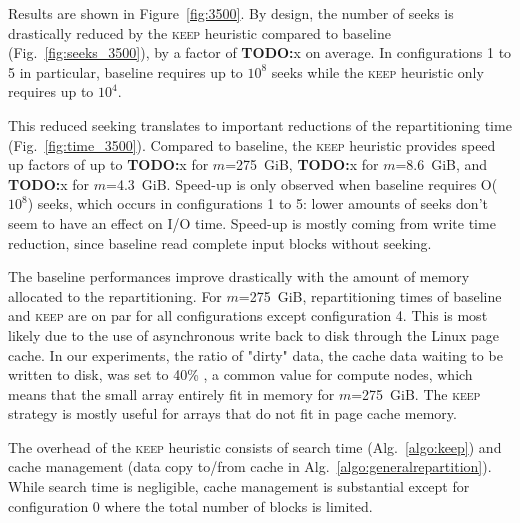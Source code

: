 \documentclass[sigconf, nonacm]{acmart}
\newcommand{\todo}[1]{\color{red}\textbf{TODO:}#1\color{black}}
\newcommand{\keep}[0]{\textsc{keep}\xspace}
\begin{document}
Results are shown in Figure~\ref{fig:3500}.
By design, the number of seeks is drastically reduced by the \keep
heuristic compared to baseline (Fig.~\ref{fig:seeks_3500}), by a factor of
\todo{x} on average. In configurations 1 to 5 in particular, baseline
requires up to $10^8$ seeks while the \keep heuristic only requires up to
$10^4$.

This reduced seeking translates to important reductions of the
repartitioning time (Fig.~\ref{fig:time_3500}). Compared to baseline, the
\keep heuristic provides speed up factors of up to \todo{x} for
$m$=275~GiB, \todo{x} for $m$=8.6~GiB, and \todo{x} for $m$=4.3~GiB.
Speed-up is only observed when baseline requires O($10^8$) seeks, which occurs
in configurations 1 to 5: lower amounts of seeks don't seem to have an effect on
I/O time. Speed-up is mostly coming from write time reduction, since
baseline read complete input blocks without seeking.



The baseline performances improve drastically with the amount of memory
allocated to the repartitioning. For $m$=275~GiB, repartitioning times of
baseline and \keep are on par for all configurations except configuration
4. This is most likely due to the use of asynchronous write back to disk
through the Linux page cache. In our experiments, the ratio of "dirty"
data, the cache data waiting to be written to disk, was set to 40\% , a
common value for compute nodes, which means that the small array entirely
fit in memory for $m$=275~GiB. The \keep strategy is mostly useful for
arrays that do not fit in page cache memory.

The overhead of the \keep heuristic consists of search time
(Alg.~\ref{algo:keep}) and cache management (data copy to/from cache in
Alg.~\ref{algo:generalrepartition}). While search time is negligible, cache
management is substantial except for configuration 0 where the total number
of blocks is limited.
\end{document}
